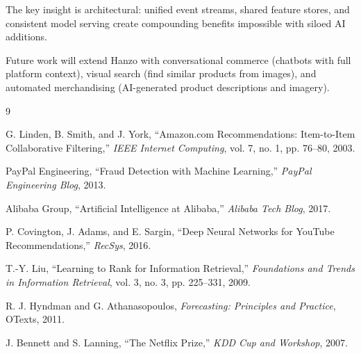 \documentclass[11pt,twocolumn]{article}
\begin{document}
The key insight is architectural: unified event streams, shared feature stores, and consistent model serving create compounding benefits impossible with siloed AI additions.

Future work will extend Hanzo with conversational commerce (chatbots with full platform context), visual search (find similar products from images), and automated merchandising (AI-generated product descriptions and imagery).

\begin{thebibliography}{9}

G. Linden, B. Smith, and J. York, ``Amazon.com Recommendations: Item-to-Item Collaborative Filtering,'' \textit{IEEE Internet Computing}, vol. 7, no. 1, pp. 76--80, 2003.

PayPal Engineering, ``Fraud Detection with Machine Learning,'' \textit{PayPal Engineering Blog}, 2013.

Alibaba Group, ``Artificial Intelligence at Alibaba,'' \textit{Alibaba Tech Blog}, 2017.

P. Covington, J. Adams, and E. Sargin, ``Deep Neural Networks for YouTube Recommendations,'' \textit{RecSys}, 2016.

T.-Y. Liu, ``Learning to Rank for Information Retrieval,'' \textit{Foundations and Trends in Information Retrieval}, vol. 3, no. 3, pp. 225--331, 2009.

R. J. Hyndman and G. Athanasopoulos, \textit{Forecasting: Principles and Practice}, OTexts, 2011.

J. Bennett and S. Lanning, ``The Netflix Prize,'' \textit{KDD Cup and Workshop}, 2007.

\end{thebibliography}
\end{document}
